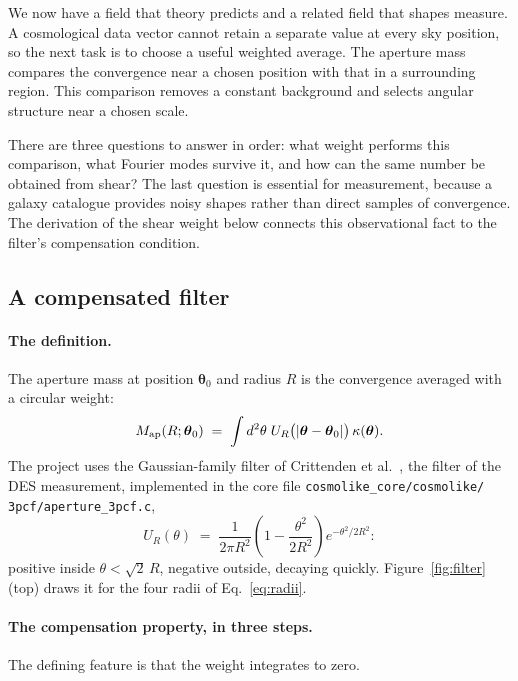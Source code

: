 \documentclass[11pt]{article}
\newcommand{\Map}{M_{\rm ap}}
\newcommand{\Ufil}{U_R}
\newcommand{\btheta}{\boldsymbol{\theta}}
\newcommand{\us}{\_\allowbreak}
\numberwithin{equation}{section}
\begin{document}
We now have a field that theory predicts and a related field that shapes
measure. A cosmological data vector cannot retain a separate value at
every sky position, so the next task is to choose a useful weighted
average. The aperture mass compares the convergence near a chosen
position with that in a surrounding region. This comparison removes a
constant background and selects angular structure near a chosen scale.

There are three questions to answer in order: what weight performs this
comparison, what Fourier modes survive it, and how can the same number be
obtained from shear? The last question is essential for measurement,
because a galaxy catalogue provides noisy shapes rather than direct
samples of convergence. The derivation of the shear weight below connects
this observational fact to the filter's compensation condition.

\subsection{A compensated filter}
\label{sec:filter}

\paragraph{The definition.}
The aperture mass at position $\btheta_0$ and radius $R$ is the
convergence averaged with a circular weight:
\begin{equation}
  \Map(R;\btheta_0)
  \;=\; \int d^2\theta\;
  \Ufil\bigl(|\btheta - \btheta_0|\bigr)\,
  \kappa(\btheta) .
  \label{eq:mapdef}
\end{equation}
The project uses the Gaussian-family filter of Crittenden et
al.~\cite{Crittenden}, the filter of the DES measurement,
implemented in the core file
\texttt{cosmolike\us core/\allowbreak cosmolike/\allowbreak
3pcf/\allowbreak aperture\us 3pcf.c},
\begin{equation}
  \Ufil(\theta)
  \;=\; \frac{1}{2\pi R^2}
  \left(1 - \frac{\theta^2}{2R^2}\right)
  e^{-\theta^2/2R^2} :
  \label{eq:ufil}
\end{equation}
positive inside $\theta < \sqrt{2}\,R$, negative outside, decaying
quickly.  Figure~\ref{fig:filter} (top) draws it for the four radii
of Eq.~\eqref{eq:radii}.

\paragraph{The compensation property, in three steps.}
The defining feature is that the weight integrates to zero.
\end{document}
